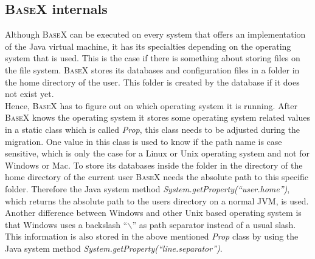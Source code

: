 \subsection{\textsc{BaseX} internals}
\label{sec:migration:basex-internals}
Although \textsc{BaseX} can be executed on every system that offers an implementation of the Java virtual machine, it has its specialties depending on the operating system that is used.
This is the case if there is something about storing files on the file system.
\textsc{BaseX} stores its databases and configuration files in a folder in the home directory of the user.
This folder is created by the database if it does not exist yet.\\
Hence, \textsc{BaseX} has to figure out on which operating system it is running.
After \textsc{BaseX} knows the operating system it stores some operating system related values in a static class which is called \textit{Prop}, this class needs to be adjusted during the migration.
One value in this class is used to know if the path name is case sensitive, which is only the case for a Linux or Unix operating system and not for Windows or Mac.
To store its databases inside the folder in the directory of the home directory of the current user \textsc{BaseX} needs the absolute path to this specific folder.
Therefore the Java system method \textit{System.getProperty(``user.home'')}, which returns the absolute path to the users directory on a normal JVM, is used.\\
Another difference between Windows and other Unix based operating system is that Windows uses a backslash ``\textit{$\backslash$}'' as path separator instead of a usual slash.
This information is also stored in the above mentioned \textit{Prop} class by using the Java system method \textit{System.getProperty(``line.separator'')}.

